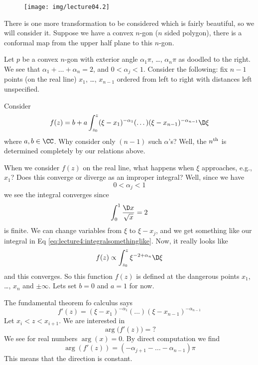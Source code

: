 \begin{wrapfigure}{r}{1in}
\vspace{-20pt}
\begin{center}
\texttt{[image: img/lecture04.2]}
\end{center}
\vspace{-20pt}
\end{wrapfigure}
There is one more transformation to be considered which is fairly
beautiful, so we will consider it. Suppose we have a convex
$n$-gon ($n$ sided polygon), there is a conformal map from the
upper half plane to this $n$-gon.

Let $p$ be a convex $n$-gon with exterior angle $\alpha_{1}\pi$,
\dots, $\alpha_{n}\pi$ as doodled to the right. We see that
$\alpha_{1}+\dots+\alpha_{n}=2$, and $0<\alpha_{j}<1$. Consider
the following: fix $n-1$ points (on the real line) $x_{1}$,
\dots, $x_{n-1}$ ordered from left to right with distances left
unspecified. 

Consider
\begin{equation}
f(z)=b+a\int^{z}_{z_{0}}(\xi-x_{1})^{-\alpha_{1}}(\dots)(\xi-x_{n-1})^{-\alpha_{n-1}}\D\xi
\end{equation}
where $a,b\in\CC$. Why consider only $(n-1)$ such $\alpha$'s?
Well, the $n^{\rm th}$ is determined completely by our relations
above. 

When we consider $f(z)$ on the real line, what happens when $\xi$
approaches, e.g., $x_{1}$? Does this converge or diverge as an
improper integral? Well, since we have
\begin{equation}
0<\alpha_{j}<1
\end{equation}
we see the integral converges since
\begin{equation}\label{eq:lecture4:integralsomethinglike}
\int^{1}_{0}\frac{\D x}{\sqrt{x}}=2
\end{equation}
is finite. We can change variables from $\xi$ to $\xi-x_{j}$, and
we get something like our integral in Eq \eqref{eq:lecture4:integralsomethinglike}.
Now, it really looks like
\begin{equation}
f(z)\propto\int^{z}_{z_{0}}\xi^{-2+\alpha_{n}}\D\xi
\end{equation}
and this converges. So this function $f(z)$ is defined at the
dangerous points $x_{1}$, \dots, $x_{n}$ and $\pm\infty$. Lets
set $b=0$ and $a=1$ for now.

The fundamental theorem fo calculus says
\begin{equation}
f'(z)=(\xi-x_{1})^{-\alpha_{1}}(\dots)(\xi-x_{n-1})^{-\alpha_{n-1}}
\end{equation}
Let $x_{i}<z<x_{i+1}$. We are interested in
\begin{equation}
\arg\big(f'(z)\big)=?
\end{equation}
We see for real numbers $\arg(x)=0$. By direct computation we
find
\begin{equation}
\arg\left(f'(z)\right)=(-\alpha_{j+1}-\dots-\alpha_{n-1})\pi
\end{equation}
This means that the direction is constant.

